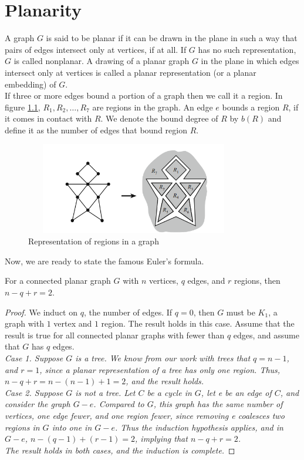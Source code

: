 \documentclass[../basic_graph_theory.tex]{subfiles}
\begin{document}
\chapter{Planarity}
\setcounter{chapter}{6} %
\setcounter{section}{6}
\setcounter{equation}{6}
\setcounter{figure}{6}

A graph $G$ is said to be planar if it can be drawn in the plane in such a way that pairs of edges intersect only at vertices, if at all. If $G$ has no such representation, $G$ is called nonplanar. A drawing of a planar graph $G$ in the plane in which edges intersect only at vertices is called a planar representation (or a planar embedding) of $G$.\\

If three or more edges bound a portion of a graph then we call it a region. In figure \ref{ref:regions}, $R_1, R_2, \dots, R_7$ are regions in the graph. An edge $e$ bounds a region $R$, if it comes in contact with $R$. We denote the bound degree of $R$ by $b(R)$ and define it as the number of edges that bound region $R$.

\begin{figure}[hbt!]
    \label{ref:regions}
    \centering
    \includegraphics[height=4cm,width=9.5cm]{images/region.png}
    \caption{Representation of regions in a graph}
\end{figure}

Now, we are ready to state the famous Euler's formula.
\begin{thm}
    For a connected planar graph $G$ with $n$ vertices, $q$ edges, and $r$ regions, then $n-q+r=2$.
\end{thm}
\begin{proof}
    We induct on $q$, the number of edges. If $q = 0$, then $G$ must be $K_1$, a graph with $1$ vertex and $1$ region. The result holds in this case. Assume that the result is true for all connected planar graphs with fewer than $q$ edges, and assume that $G$ has $q$ edges.\\
    \em{Case 1.} Suppose $G$ is a tree. We know from our work with trees that $q = n-1$, and $r = 1$, since a planar representation of a tree has only one region. Thus, $n - q + r = n - (n - 1) + 1 = 2$, and the result holds.\\
    \em{Case 2.} Suppose $G$ is not a tree. Let $C$ be a cycle in $G$, let e be an edge of $C$, and consider the graph $G - e$. Compared to $G$, this graph has the same number of vertices, one edge fewer, and one region fewer, since removing e coalesces two regions in $G$ into one in $G - e$. Thus the induction hypothesis applies, and in $G - e$, $n - (q - 1) + (r - 1) = 2$, implying that $n - q + r = 2$.\\
    The result holds in both cases, and the induction is complete.
\end{proof}
\end{document}
